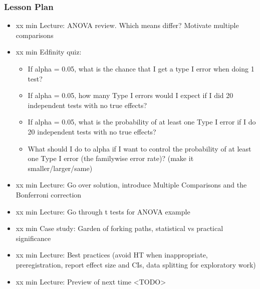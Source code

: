 \begin{frame}
    \frametitle{Lesson Plan}
    \begin{itemize}
        \item xx min Lecture: ANOVA review. Which means differ? Motivate multiple comparisons
        \item xx min Edfinity quiz:
        \begin{itemize}
            \item If alpha = 0.05, what is the chance that I get a type I error when doing 1 test?
            \item If alpha = 0.05, how many Type I errors would I expect if I did 20 independent tests with no true effects?
            \item If alpha = 0.05, what is the probability of at least one Type I error if I do 20 independent tests with no true effects?
            \item What should I do to alpha if I want to control the probability of at least one Type I error (the familywise error rate)? (make it smaller/larger/same)
        \end{itemize}
        \item xx min Lecture: Go over solution, introduce Multiple Comparisons and the Bonferroni correction
        \item xx min Lecture: Go through t tests for ANOVA example
        \item xx min Case study: Garden of forking paths, statistical vs practical significance
        \item xx min Lecture: Best practices (avoid HT when inappropriate, preregistration, report effect size and CIs, data splitting for exploratory work)
        \item xx min Lecture: Preview of next time <TODO>
    \end{itemize}
\end{frame}

    
